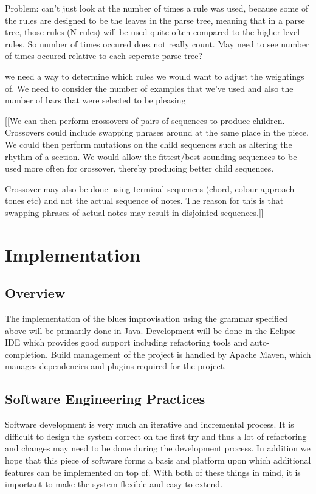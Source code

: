\documentclass[pdftex,12pt,a4paper]{report}
\begin{document}
Problem: can't just look at the number of times a rule was used, because some of the rules are designed to be the leaves in the parse tree, meaning that in a parse tree, those rules (N rules) will be used quite often compared to the higher level rules. So number of times occured does not really count. May need to see number of times occured relative to each seperate parse tree?


we need a way to determine which rules we would want to adjust the weightings of. We need to consider the number of examples that we've used and also the number of bars that were selected to be pleasing 


[[We can then perform crossovers of pairs of sequences to produce children. Crossovers could include swapping phrases around at the same place in the piece. We could then perform mutations on the child sequences such as altering the rhythm of a section. We would allow the fittest/best sounding sequences to be used more often for crossover, thereby producing better child sequences.

Crossover may also be done using terminal sequences (chord, colour approach tones etc) and not the actual sequence of notes. The reason for this is that swapping phrases of actual notes may result in disjointed sequences.]]

\chapter{Implementation}

\section{Overview}
The implementation of the blues improvisation using the grammar specified above will be primarily done in Java. Development will be done in the Eclipse IDE which provides good support including refactoring tools and auto-completion. Build management of the project is handled by Apache Maven, which manages dependencies and plugins required for the project. 

\section{Software Engineering Practices}
Software development is very much an iterative and incremental process. It is difficult to design the system correct on the first try and thus a lot of refactoring and changes may need to be done during the development process. In addition we hope that this piece of software forms a basis and platform upon which additional features can be implemented on top of. With both of these things in mind, it is important to make the system flexible and easy to extend. 
\end{document}
